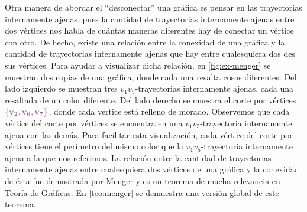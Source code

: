 Otra manera de abordar el ``desconectar'' una gr\'afica es  pensar en las
trayectorias internamente ajenas, pues la cantidad de trayectorias internamente
ajenas entre dos v\'ertices nos habla de cu\'antas maneras diferentes hay de
conectar un v\'ertice con otro. De hecho, existe una relaci\'on entre la
conexidad de una gr\'afica y la cantidad de trayectorias internamente ajenas que
hay entre cualesquiera dos des sus v\'ertices. Para ayudar a visualizar dicha
relaci\'on, en \cref{fig:ex-menger} se muestran dos copias de una gr\'afica,
donde cada una resalta cosas diferentes. Del lado izquierdo se muestran tres
$v_1v_5$-trayectorias internamente ajenas, cada una resaltada de un color
diferente. Del lado derecho se muestra el corte por v\'ertices
${\color{morado}\bf \{v_2, v_6, v_7\} }$, donde cada v\'ertice est\'a relleno de
morado. Observemos que cada v\'ertice del corte por v\'ertices se encuentra en
una $v_1v_5$-trayectoria internamente ajena con las dem\'as. Para facilitar esta
visualizaci\'on, cada v\'ertice del corte por v\'ertices tiene el per\'imetro
del mismo color que la $v_1v_5$-trayectoria internamente ajena a la que nos
referimos. La relaci\'on entre la cantidad de trayectorias internamente ajenas
entre cualesquiera dos v\'ertices de una gr\'afica y la conexidad de \'esta fue
demostrada por Menger y es un teorema de mucha relevancia en Teor\'ia de
Gr\'aficas. En \cref*{teo:menger} se demuestra una versi\'on global de este
teorema. 

